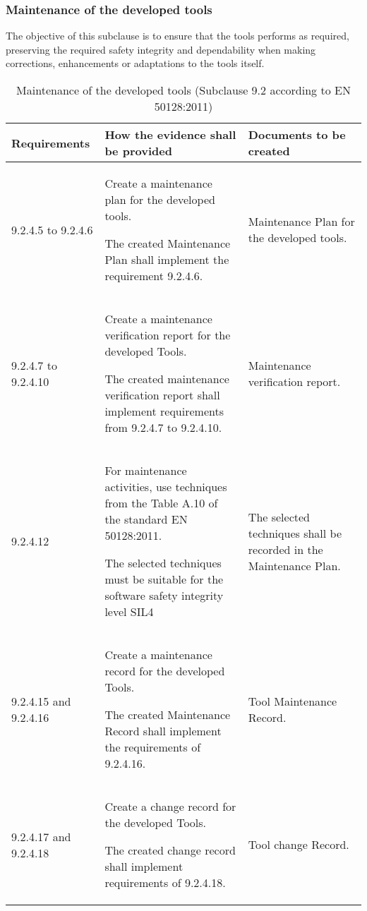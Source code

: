 \documentclass{template/openetcs_report}
\begin{document}

\subsubsection{Maintenance of the developed tools}
\begin{flushleft}
 The objective of this subclause is to ensure that the tools performs as required, preserving the required safety integrity and dependability when making corrections, enhancements or adaptations to the tools itself.
 \end{flushleft} 
{\footnotesize\sffamily\centering
\begin{longtable}{|p{2cm}|p{9cm}|p{3cm}|}
\caption{Maintenance of the developed tools (Subclause 9.2 according to EN 50128:2011)}\\
\hline
\bfseries Requirements & \bfseries How the evidence shall be provided & \bfseries Documents to be created\\
\hline
\hline
\endhead
\hline
\endfoot

9.2.4.5 to 9.2.4.6 & Create a maintenance plan for the developed tools.

The created Maintenance Plan shall implement the requirement 9.2.4.6.
& Maintenance Plan for the developed tools.\\ 
\hline
9.2.4.7 to 9.2.4.10 & Create a maintenance verification report for the developed Tools.

The created maintenance verification report shall implement requirements from 9.2.4.7 to 9.2.4.10.
& Maintenance verification report.\\ 
\hline
9.2.4.12 & For maintenance activities, use techniques from the Table A.10 of the standard EN 50128:2011.

The selected techniques must be suitable for the software safety integrity level SIL4 
& The selected techniques shall be recorded in the Maintenance Plan.\\ 
\hline
9.2.4.15 and 9.2.4.16 & Create a maintenance record for the developed Tools.

The created Maintenance Record shall implement the requirements of 9.2.4.16.
& Tool Maintenance Record.\\ 
\hline
9.2.4.17 and 9.2.4.18 & Create a change record for the developed Tools.

The created change record shall implement requirements of 9.2.4.18.
& Tool change Record.\\ 
\hline
\end{longtable}}
\end{document}
